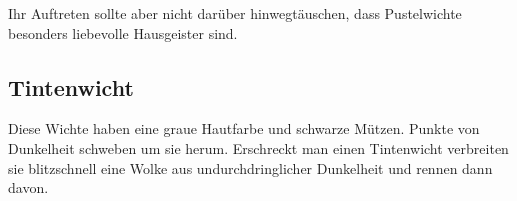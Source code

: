 \documentclass[12pt,twoside,twocolumn,openany]{book}
\begin{document}
Ihr Auftreten sollte aber nicht darüber hinwegtäuschen, dass Pustelwichte besonders liebevolle Hausgeister sind.

\subsection{Tintenwicht} Diese Wichte haben eine graue Hautfarbe und schwarze Mützen. Punkte von Dunkelheit schweben um sie herum. Erschreckt man einen Tintenwicht verbreiten sie blitzschnell eine Wolke aus undurchdringlicher Dunkelheit und rennen dann davon.



%
%			
%		
%		
%		
\end{document}
